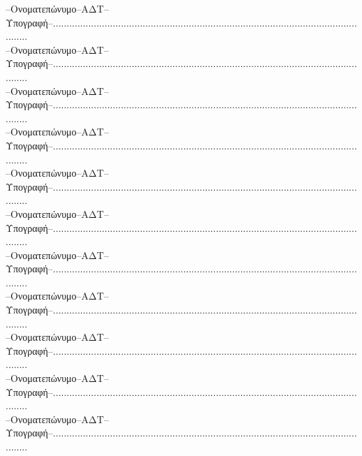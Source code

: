 \documentclass[a4paper]{article}
\begin{document}
{
\noindent --Ονοματεπώνυμο--ΑΔΤ--Υπογραφή--........................................................................................................................\\

\noindent --Ονοματεπώνυμο--ΑΔΤ--Υπογραφή--........................................................................................................................\\

\noindent --Ονοματεπώνυμο--ΑΔΤ--Υπογραφή--........................................................................................................................\\

\noindent --Ονοματεπώνυμο--ΑΔΤ--Υπογραφή--........................................................................................................................\\

\noindent --Ονοματεπώνυμο--ΑΔΤ--Υπογραφή--........................................................................................................................\\

\noindent --Ονοματεπώνυμο--ΑΔΤ--Υπογραφή--........................................................................................................................\\

\noindent --Ονοματεπώνυμο--ΑΔΤ--Υπογραφή--........................................................................................................................\\

\noindent --Ονοματεπώνυμο--ΑΔΤ--Υπογραφή--........................................................................................................................\\

\noindent --Ονοματεπώνυμο--ΑΔΤ--Υπογραφή--........................................................................................................................\\

\noindent --Ονοματεπώνυμο--ΑΔΤ--Υπογραφή--........................................................................................................................\\

\noindent --Ονοματεπώνυμο--ΑΔΤ--Υπογραφή--........................................................................................................................\\

}
\end{document}
